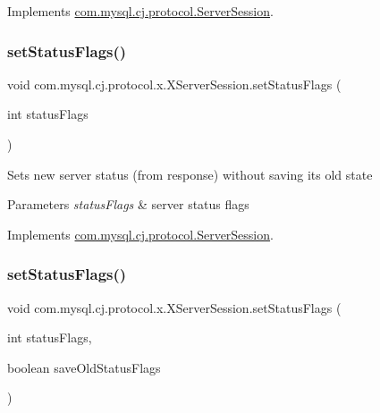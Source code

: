 Implements \mbox{\hyperlink{interfacecom_1_1mysql_1_1cj_1_1protocol_1_1_server_session_a47e9a273ef6de1e09dbacada62650998}{com.\+mysql.\+cj.\+protocol.\+Server\+Session}}.

\mbox{\label{classcom_1_1mysql_1_1cj_1_1protocol_1_1x_1_1_x_server_session_a30539eae0f7311ac3cd5c9f44c8f7585}} 
\subsubsection{\texorpdfstring{set\+Status\+Flags()}{setStatusFlags()}\hspace{0.1cm}{\footnotesize\ttfamily [1/2]}}
{\footnotesize\ttfamily void com.\+mysql.\+cj.\+protocol.\+x.\+X\+Server\+Session.\+set\+Status\+Flags (\begin{DoxyParamCaption}\item[{int}]{status\+Flags }\end{DoxyParamCaption})}

Sets new server status (from response) without saving it\textquotesingle{}s old state


\begin{DoxyParams}{Parameters}
{\em status\+Flags} & server status flags \\
\hline
\end{DoxyParams}


Implements \mbox{\hyperlink{interfacecom_1_1mysql_1_1cj_1_1protocol_1_1_server_session_a855cbd715a8c33299d062a72fd75d8f4}{com.\+mysql.\+cj.\+protocol.\+Server\+Session}}.

\mbox{\label{classcom_1_1mysql_1_1cj_1_1protocol_1_1x_1_1_x_server_session_a6b21c9c5c8446643ae85e58c3fe97af8}} 
\subsubsection{\texorpdfstring{set\+Status\+Flags()}{setStatusFlags()}\hspace{0.1cm}{\footnotesize\ttfamily [2/2]}}
{\footnotesize\ttfamily void com.\+mysql.\+cj.\+protocol.\+x.\+X\+Server\+Session.\+set\+Status\+Flags (\begin{DoxyParamCaption}\item[{int}]{status\+Flags,  }\item[{boolean}]{save\+Old\+Status\+Flags }\end{DoxyParamCaption})}

